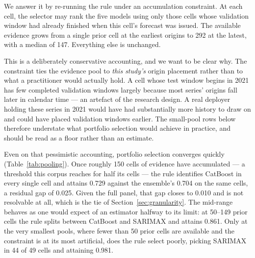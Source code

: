\documentclass[11pt]{article}
\begin{document}
We answer it by re-running the rule under an accumulation constraint. At each cell, the selector may rank the five models using only those cells whose validation window had already finished when this cell's forecast was issued. The available evidence grows from a single prior cell at the earliest origins to 292 at the latest, with a median of 147. Everything else is unchanged.

This is a deliberately conservative accounting, and we want to be clear why. The constraint ties the evidence pool to \emph{this study's} origin placement rather than to what a practitioner would actually hold. A cell whose test window begins in 2021 has few completed validation windows largely because most series' origins fall later in calendar time --- an artefact of the research design. A real deployer holding these series in 2021 would have had substantially more history to draw on and could have placed validation windows earlier. The small-pool rows below therefore understate what portfolio selection would achieve in practice, and should be read as a floor rather than an estimate.

Even on that pessimistic accounting, portfolio selection converges quickly (Table~\ref{tab:pooling}). Once roughly 150 cells of evidence have accumulated --- a threshold this corpus reaches for half its cells --- the rule identifies CatBoost in every single cell and attains 0.729 against the ensemble's 0.704 on the same cells, a residual gap of 0.025. Given the full panel, that gap closes to 0.010 and is not resolvable at all, which is the tie of Section~\ref{sec:granularity}. The mid-range behaves as one would expect of an estimator halfway to its limit: at 50--149 prior cells the rule splits between CatBoost and SARIMAX and attains 0.861. Only at the very smallest pools, where fewer than 50 prior cells are available and the constraint is at its most artificial, does the rule select poorly, picking SARIMAX in 44 of 49 cells and attaining 0.981.
\end{document}
